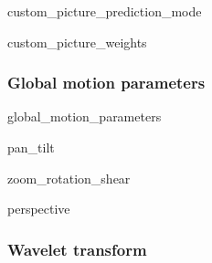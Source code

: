 {\begin{pseudo}{custom\_picture\_prediction\_mode}{}
\bsIF{\CustomPicturePredictionMode}
 \bsEND

\end{pseudo}

\begin{pseudo}{custom\_picture\_weights}{}
\bsIF{\CustomReferenceWeights}
  \bsEND
 \bsEND
\end{pseudo}


\subsubsection{Global motion parameters}

\begin{pseudo}{global\_motion\_parameters}{}
\end{pseudo}

\begin{pseudo}{pan\_tilt}{}
\bsIF{\NonZeroPanTiltFlag}
 \bsEND

\end{pseudo}

\begin{pseudo}{zoom\_rotation\_shear}{}
\bsIF{\NonZeroZRSFlag}
 \bsEND

\end{pseudo}

\begin{pseudo}{perspective}{}
\bsIF{\NonZeroPerspectiveFlag}
 \bsEND
\end{pseudo}

\subsubsection{Wavelet transform}

}
